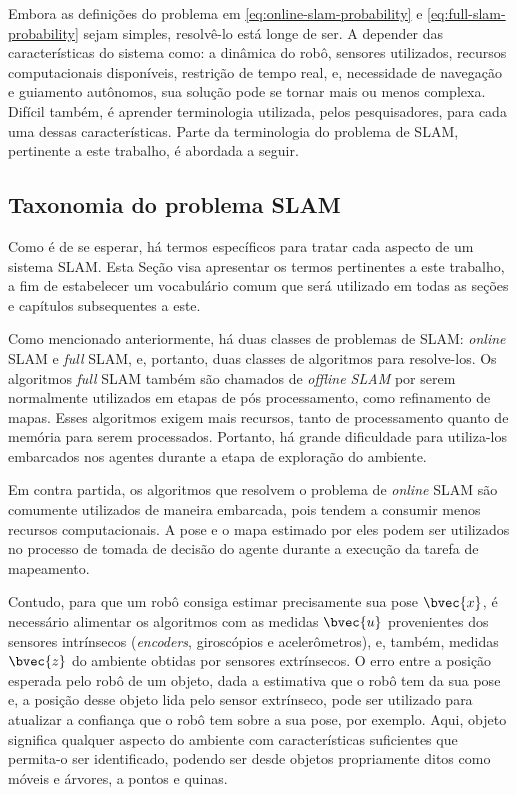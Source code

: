 Embora as definições do problema em \ref{eq:online-slam-probability} e 
\ref{eq:full-slam-probability} sejam simples, resolvê-lo está longe de ser. 
A depender das características do sistema como: a dinâmica do robô, sensores utilizados, recursos computacionais disponíveis, restrição de tempo real, e, 
necessidade de navegação e guiamento autônomos, sua solução pode se tornar mais 
ou menos complexa. Difícil também, é aprender terminologia utilizada, pelos 
pesquisadores, para cada uma dessas características. Parte da terminologia do problema de SLAM,
pertinente a este trabalho, é abordada a seguir.

\subsection*{Taxonomia do problema SLAM}
Como é de se esperar, há termos específicos para tratar cada aspecto de um 
sistema SLAM. Esta Seção visa apresentar os termos pertinentes a este trabalho, 
a fim de estabelecer um vocabulário comum que será utilizado em todas as seções 
e capítulos subsequentes a este.

Como mencionado anteriormente, há duas classes de problemas de SLAM: 
\textit{online} SLAM e \textit{full} SLAM, e, portanto, duas classes de 
algoritmos para resolve-los. Os algoritmos \textit{full} SLAM também são chamados 
de \emph{offline SLAM} por serem normalmente utilizados em etapas de pós 
processamento, como refinamento de mapas. Esses algoritmos exigem mais 
recursos, tanto de processamento quanto de memória para serem processados. 
Portanto, há grande dificuldade para utiliza-los embarcados nos agentes durante 
a etapa de exploração do ambiente.

Em contra partida, os algoritmos que resolvem o problema de \textit{online} 
SLAM são comumente utilizados de maneira embarcada, pois tendem a 
consumir menos recursos computacionais. A pose e o mapa estimado por eles podem 
ser utilizados no processo de tomada de decisão do agente durante a execução da 
tarefa de mapeamento. 

Contudo, para que um robô consiga estimar precisamente sua pose $\bvec{x}$, é 
necessário alimentar os algoritmos com as medidas $\bvec{u}$ provenientes dos 
sensores intrínsecos (\textit{encoders}, giroscópios e acelerômetros), e, 
também, medidas $\bvec{z}$ do ambiente obtidas por sensores extrínsecos. O erro 
entre a posição esperada pelo robô de um objeto, dada a estimativa que o robô tem da sua pose e, a posição desse objeto lida pelo sensor extrínseco, pode ser 
utilizado para atualizar a confiança que o robô tem sobre a sua pose, por 
exemplo. Aqui, objeto significa qualquer aspecto do ambiente com características 
suficientes que permita-o ser identificado, podendo ser desde objetos
propriamente ditos como móveis e árvores, a pontos e quinas.

